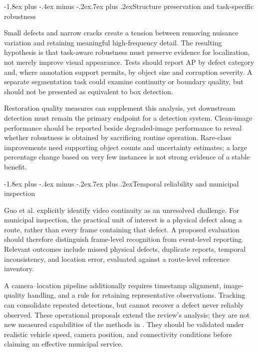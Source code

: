 \documentclass[11pt,a4paper]{article}
\makeatletter
\renewcommand\subsection{\@startsection{subsection}{2}{\z@}%
  {-1.8ex plus -.4ex minus -.2ex}{.7ex plus .2ex}{\normalfont\normalsize\bfseries}}
\makeatother
\begin{document}
\subsection{Structure preservation and task-specific robustness}

Small defects and narrow cracks create a tension between removing nuisance variation and retaining meaningful high-frequency detail. The resulting hypothesis is that task-aware robustness must preserve evidence for localization, not merely improve visual appearance. Tests should report AP by defect category and, where annotation support permits, by object size and corruption severity. A separate segmentation task could examine continuity or boundary quality, but should not be presented as equivalent to box detection.

Restoration quality measures can supplement this analysis, yet downstream detection must remain the primary endpoint for a detection system. Clean-image performance should be reported beside degraded-image performance to reveal whether robustness is obtained by sacrificing routine operation. Rare-class improvements need supporting object counts and uncertainty estimates; a large percentage change based on very few instances is not strong evidence of a stable benefit.

\subsection{Temporal reliability and municipal inspection}

Guo et al. \cite{r5} explicitly identify video continuity as an unresolved challenge. For municipal inspection, the practical unit of interest is a physical defect along a route, rather than every frame containing that defect. A proposed evaluation should therefore distinguish frame-level recognition from event-level reporting. Relevant outcomes include missed physical defects, duplicate reports, temporal inconsistency, and location error, evaluated against a route-level reference inventory.

A camera--location pipeline additionally requires timestamp alignment, image-quality handling, and a rule for retaining representative observations. Tracking can consolidate repeated detections, but cannot recover a defect never reliably observed. These operational proposals extend the review's analysis; they are not new measured capabilities of the methods in \cite{r3,r4,r5,r6}. They should be validated under realistic vehicle speed, camera position, and connectivity conditions before claiming an effective municipal service.
\end{document}
